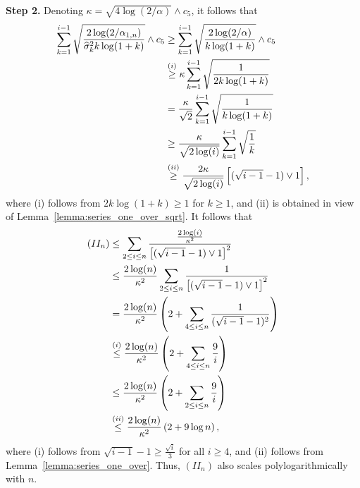 \textbf{Step 2.} Denoting $\kappa = \sqrt{4 \log (2 / \alpha)} \wedge c_5$, it follows that
\begin{align*}
     \sum_{k=1}^{i-1} \sqrt\frac{2\log(2/\alpha_{1,n})}{\widehat \sigma_{k}^2 k \log (1+k)} \wedge c_5 &\geq \sum_{k=1}^{i-1} \sqrt\frac{2\log(2/\alpha)}{k \log (1+k)} \wedge c_5
     \\&\stackrel{(i)}{\geq}\kappa\sum_{k=1}^{i-1} \sqrt\frac{1}{2k \log (1+k)}
     \\&= \frac{\kappa}{\sqrt{2}}\sum_{k=1}^{i-1} \sqrt\frac{1}{k \log (1+k)}
     \\&\geq \frac{\kappa}{\sqrt{2 \log (i)}}\sum_{k=1}^{i-1} \sqrt\frac{1}{k }
     \\&\stackrel{(ii)}{\geq} \frac{2\kappa}{\sqrt{2 \log (i)}} \left[ (\sqrt{i-1} - 1) \vee 1 \right],
\end{align*}
where (i) follows from $2k \log (1+k) \geq 1$ for $k \geq 1$, and (ii) is obtained in view of Lemma~\ref{lemma:series_one_over_sqrt}. It follows that 
\begin{align*}
     (II_n) &\leq \sum_{2\leq i \leq n} \frac{\frac{2 \log (i)}{\kappa^2}}{\left[ (\sqrt{i-1} - 1) \vee 1 \right]^2}  
     \\&\leq \frac{2 \log (n)}{\kappa^2} \sum_{2\leq i \leq n} \frac{1}{\left[ (\sqrt{i-1} - 1) \vee 1 \right]^2}  
     \\&= \frac{2 \log (n)}{\kappa^2} \left( 2+ \sum_{4\leq i \leq n} \frac{1}{(\sqrt{i-1} - 1)^2}  \right)  
     \\&\stackrel{(i)}{\leq} \frac{2 \log (n)}{\kappa^2} \left( 2+ \sum_{4\leq i \leq n} \frac{9}{i}  \right)  
     \\&\stackrel{}{\leq} \frac{2 \log (n)}{\kappa^2} \left( 2+ \sum_{2\leq i \leq n} \frac{9}{i}  \right) 
    \\&\stackrel{(ii)}{\leq} \frac{2 \log (n)}{\kappa^2} \left( 2+ 9 \log n  \right),
\end{align*}
where (i) follows from $\sqrt{i-1} - 1 \geq \frac{\sqrt i}{3}$ for all $i \geq 4$, and (ii) follows from Lemma~\ref{lemma:series_one_over}. Thus, $(II_n)$ also scales polylogarithmically with $n$.



